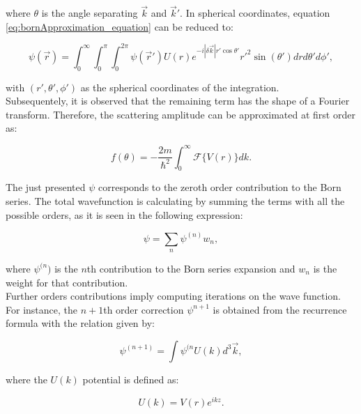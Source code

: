 \documentclass[openany]{book}
\begin{document}
where $\theta$ is the angle separating $\vec k$ and $\vec k'$. In spherical coordinates, equation \ref{eq:bornApproximation_equation} can be reduced to:

\begin{equation} \label{eq:bornApproximation_equation_spherical}
	 	\psi(\vec r) = \int_{0}^{\infty} \int_{0}^{\pi} \int_{0}^{2\pi} { \psi(\vec r' )U(r)e^{-i|\delta \vec k|r'\cos \theta' } {r'}^{2}   \sin(\theta') dr d\theta' d\phi' },
\end{equation}

with $(r', \theta', \phi')$ as the spherical coordinates of the integration. \\
 
Subsequentely, it is observed that the remaining term has the shape of a Fourier transform. Therefore, the scattering amplitude can be approximated at first order as:

\begin{equation} \label{eq:bornApproximation_scatteringAmplitude}
	f(\theta) =   - \frac{2m}{\hbar^2} \int_{0}^{\infty} {\mathcal{F}\{V(r)\}dk}.
\end{equation}

The just presented  $\psi$ corresponds to the zeroth order contribution to the Born series. The total wavefunction is calculating by summing the terms with all the possible orders, as it is seen in the following expression: 

\begin{equation} \label{eq:bornApproximation_series}
	\psi = \sum_n{\psi^{(n)}w_n},
\end{equation}

where $\psi^{(n})$ is the $n$th contribution to the Born series expansion and $w_n$ is the weight for that contribution. \\

Further orders contributions imply computing iterations on the wave function. For instance, the $n+1$th order correction $\psi^{n+1}$ is obtained from the recurrence formula with the relation given by:

\begin{equation} \label{eq:bornApproximation_iteration}
	\psi^{(n+1)}  = \int  \psi^{(n} U(k) d^3\vec k,
\end{equation}

where the $U(k)$ potential is defined as:

\begin{equation} \label{eq:bornApproximation_U_potential}
	U(k)  = V(r) e^{ikz}.
\end{equation}
\end{document}
